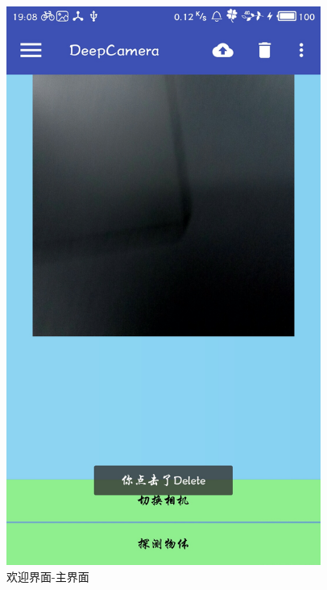 \documentclass[UTF8, Microsoft YaHei]{book}
\begin{document}
\begin{figure}[!htb]
    \begin{minipage}[c]{0.5\textwidth}
    \centering
    \includegraphics[width=0.92\textwidth]{img/主界面.png}
    \end{minipage}
    \caption{欢迎界面-主界面}
    \end{figure}
\end{document}
